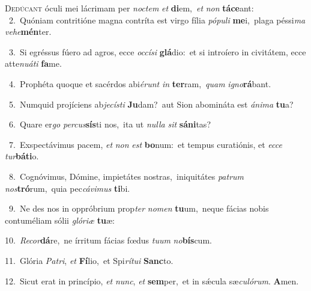 \lettrine{\initial\textcolor{\initialcolor}{D}}{edúcant} óculi mei lácrimam per \textit{noc}\-\textit{tem} \textit{et} \textbf{di}\-em,~\star \textit{et} \textit{non} \textbf{tá}\-\textbf{ce}ant:\\
{\numbfont\textcolor{\numbcolor}{~2.}}~Quóniam contritióne magna contríta est virgo fília \textit{pó}\-\textit{pu}\textit{li} \textbf{me}\-i,~\star plaga péssi\textit{ma} \textit{ve}\-\textit{he}\textbf{mén}ter.\par
{\numbfont\textcolor{\numbcolor}{~3.}}~Si egréssus fúero ad agros, ecce \textit{oc}\-\textit{cí}\textit{si} \textbf{glá}\-dio:~\star et si introíero in civitátem, ecce atte\-\textit{nu}\-\textit{á}\textit{ti} \textbf{fa}\-me.\par
{\numbfont\textcolor{\numbcolor}{~4.}}~Prophéta quoque et sacérdos abi\-\textit{é}\-\textit{runt} \textit{in} \textbf{ter}\-ram,~\star \textit{quam} \textit{i}\-\textit{gno}\textbf{rá}bant.\par
{\numbfont\textcolor{\numbcolor}{~5.}}~Numquid projíciens ab\-\textit{je}\-\textit{cís}\textit{ti} \textbf{Ju}\-dam?~\star aut Sion abomináta est \textit{á}\-\textit{ni}\textit{ma} \textbf{tu}\-a?\par
{\numbfont\textcolor{\numbcolor}{~6.}}~Quare er\textit{go} \textit{per}\-\textit{cus}\textbf{sís}ti nos,~\star ita ut \textit{nul}\-\textit{la} \textit{sit} \textbf{sá}\-\textbf{ni}tas?\par
{\numbfont\textcolor{\numbcolor}{~7.}}~Exspectávimus pacem, \textit{et} \textit{non} \textit{est} \textbf{bo}\-num:~\star et tempus curatiónis, et \textit{ec}\-\textit{ce} \textit{tur}\-\textbf{bá}\textbf{ti}o.\par
{\numbfont\textcolor{\numbcolor}{~8.}}~Cognóvimus, Dómine, impietátes nostras,~\dagger iniquitátes \textit{pa}\-\textit{trum} \textit{nos}\-\textbf{tró}rum,~\star quia pec\-\textit{cá}\-\textit{vi}\textit{mus} \textbf{ti}\-bi.\par
{\numbfont\textcolor{\numbcolor}{~9.}}~Ne des nos in oppróbrium prop\textit{ter} \textit{no}\-\textit{men} \textbf{tu}\-um,~\star neque fácias nobis contuméliam sólii \textit{gló}\-\textit{ri}\textit{æ} \textbf{tu}\-æ:\par
{\numbfont\textcolor{\numbcolor}{10.}}~\-\textit{Re}\-\textit{cor}\textbf{dá}re,~\star ne írritum fácias fœdus \textit{tu}\-\textit{um} \textit{no}\-\textbf{bís}cum.\par
{\numbfont\textcolor{\numbcolor}{11.}}~Glória \textit{Pa}\-\textit{tri}, \textit{et} \textbf{Fí}\-lio,~\star et Spi\-\textit{rí}\-\textit{tu}\textit{i} \textbf{Sanc}\-to.\par
{\numbfont\textcolor{\numbcolor}{12.}}~Sicut erat in princípio, \textit{et} \textit{nunc}\-, \textit{et} \textbf{sem}\-per,~\star et in sǽcula sæ\-\textit{cu}\-\textit{ló}\textit{rum}. \textbf{A}\-men.\par
